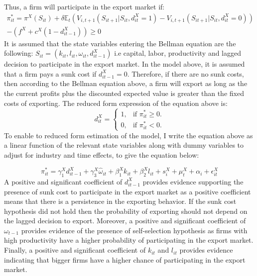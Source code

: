 \documentclass[12pt]{article}
\begin{document}
 Thus, a firm will participate in the export market if:
\begin{equation}
\begin{aligned}
\pi_{it}^{*} = \pi^{X}(S_{it})  +
\delta \mathbb{E}_{t}(V_{i,t+1}(S_{it+1}|S_{it},d_{it}^{X}=1) -
V_{i,t+1}(S_{it+1}|S_{it},d_{it}^{X}=0))\\ 
-  (f^{X} +
c^{X}(1-d_{it-1}^{X})) \geq 0
\end{aligned}
\end{equation}
It is assumed that the state variables entering the Bellman equation
are the following: $S_{it}= (k_{it}, l_{it}, \omega_{it},
d_{it-1}^{X})$ i.e capital, labor, productivity and lagged decision to
participate in the export market. In the model above, it is assumed
that a firm pays a sunk cost if $d_{it-1}^{X} = 0$. Therefore, if there are no sunk costs, then
according to the Bellman equation above, a firm will export as long as
the the current profits plus the discounted expected value is greater
than the fixed costs of exporting. 
The reduced form expression of the equation above is: 
\begin{equation}
  d_{it}^{X}=\begin{cases}
   1 , & \text{if $\pi_{it}^{*} \geq 0$}.\\
   0 , & \text{if $\pi_{it}^{*}<  0$}.
  \end{cases}
\end{equation}
To enable to reduced form estimation of the model, I write the equation above as a linear
function of the relevant state variables along with dummy variables to
adjust for industry and time effects, to give the equation below:

\begin{equation}
  \pi_{it}^{*}=   \gamma_{1}^{X} d_{it-1}^{X} + 
\gamma_{3}^{X} \hat{\omega}_{it}  + \beta_{1}^{X}k_{it}  +\beta_{2}^{X}l_{it}+
s_{i}^{X} + \mu_{t}^{X}  + \alpha_{i}+ \epsilon_{it}^{X}
\end{equation}
A positive and significant coefficient of  $d_{it-1}^{X}$ provides
evidence supporting the presence of sunk cost to participate in the
export market  as a positive coefficient means that there is a
persistence in the exporting behavior. 
If the sunk cost hypothesis did not hold then the probability of exporting
should not depend on the lagged decision to export. Moreover, a positive and significant
coefficient of $\omega_{t-1}$  provides evidence of the presence of 
self-selection hypothesis as firms with high
productivity have a higher probability of participating  in the export
market. Finally, a positive and significant coefficient of $k_{it}$
and $l_{it}$ provides evidence indicating that bigger firms have a
higher chance of participating in the export market. 
\end{document}
